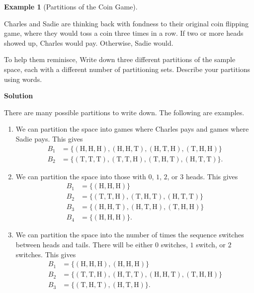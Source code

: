 \documentclass[
  letterpaper,
  DIV=11,
  numbers=noendperiod]{scrreprt}
\theoremstyle{definition}
\theoremstyle{definition}
\newtheorem{example}{Example}[chapter]
\theoremstyle{definition}
\theoremstyle{remark}
\begin{document}
\begin{example}[Partitions of the Coin
Game]\protect\hypertarget{exm-simple-partitions}{}\label{exm-simple-partitions}

Charles and Sadie are thinking back with fondness to their original coin
flipping game, where they would toss a coin three times in a row. If two
or more heads showed up, Charles would pay. Otherwise, Sadie would.

To help them reminisce, Write down three different partitions of the
sample space, each with a different number of partitioning sets.
Describe your partitions using words.

\begin{tcolorbox}[enhanced jigsaw, colback=white, colframe=quarto-callout-color-frame, arc=.35mm, leftrule=.75mm, rightrule=.15mm, opacityback=0, breakable, bottomrule=.15mm, left=2mm, toprule=.15mm]

\vspace{-3mm}\textbf{Solution}\vspace{3mm}

There are many possible partitions to write down. The following are
examples.

\begin{enumerate}
\def\labelenumi{\arabic{enumi}.}
\item
  We can partition the space into games where Charles pays and games
  where Sadie pays. This gives \begin{align*}
  B_1 &= \{(\text{H},\text{H},\text{H}), (\text{H},\text{H},\text{T}), (\text{H},\text{T},\text{H}), (\text{T},\text{H},\text{H})\}\\
  B_2 &= \{(\text{T},\text{T},\text{T}), (\text{T},\text{T},\text{H}), (\text{T},\text{H},\text{T}), (\text{H},\text{T},\text{T})\}.\end{align*}
\item
  We can partition the space into those with \(0\), \(1\), \(2\), or
  \(3\) heads. This gives \begin{align*}
  B_1 &= \{(\text{H},\text{H},\text{H})\}\\
  B_2 &= \{(\text{T},\text{T},\text{H}), (\text{T},\text{H},\text{T}), (\text{H},\text{T},\text{T})\}\\
  B_3 &= \{(\text{H},\text{H},\text{T}), (\text{H},\text{T},\text{H}), (\text{T},\text{H},\text{H})\}\\
  B_4 &= \{(\text{H},\text{H},\text{H})\}.
  \end{align*}
\item
  We can partition the space into the number of times the sequence
  switches between heads and tails. There will be either \(0\) switches,
  \(1\) switch, or \(2\) switches. This gives \begin{align*}
  B_1 &= \{(\text{H},\text{H},\text{H}), (\text{H},\text{H},\text{H})\}\\
  B_2 &= \{(\text{T},\text{T},\text{H}), (\text{H},\text{T},\text{T}), (\text{H},\text{H},\text{T}), (\text{T},\text{H},\text{H})\}\\
  B_3 &= \{(\text{T},\text{H},\text{T}),  (\text{H},\text{T},\text{H})\}.
  \end{align*}
\end{enumerate}


\end{tcolorbox}
\end{example}
\end{document}
